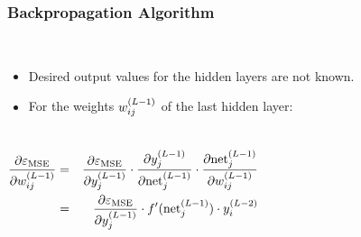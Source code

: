 \begin{frame}
  \frametitle{Backpropagation Algorithm \cont}

   \\[.25cm]

  \begin{itemize}
    \item Desired output values for the hidden layers are not known. \\[.15cm]
    \item For the weights $w_{ij}^{(L-1)}$ of the last hidden layer:
  \end{itemize}

  \begin{columns}
      \footnotesize
      \vspace*{0.5cm}
      \begin{eqnarray*}
        \frac{\partial \varepsilon_{\text{MSE}}}{\partial w_{ij}^{(L-1)}} & = &
        \frac{\partial \varepsilon_{\text{MSE}}}{\partial y_{j}^{(L-1)}} \cdot
        \frac{\partial y_{j}^{(L-1)}}{\partial \text{net}_{j}^{(L-1)}} \cdot
        \frac{\partial \text{net}_{j}^{(L-1)}}{\partial w_{ij}^{(L-1)}} \\
        & = & \frac{\partial \varepsilon_{\text{MSE}}}{\partial y_{j}^{(L-1)}} \cdot
        f'(\text{net}_{j}^{(L-1)}) \cdot y_{i}^{(L-2)}
      \end{eqnarray*}
      \begin{center}
        \resizebox{.9\linewidth}{!}{
          
        }
      \end{center}
  \end{columns}
\end{frame}


